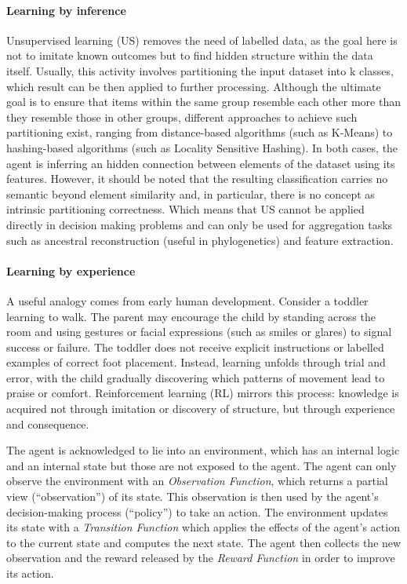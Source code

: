 \paragraph{Learning by inference}

Unsupervised learning (US) removes the need of labelled data, as the goal here is not to imitate known outcomes but to find hidden structure within the data itself.
Usually, this activity involves partitioning the input dataset into k classes, which result can be then applied to further processing.
Although the ultimate goal is to ensure that items within the same group resemble each other more than they resemble those in other groups, different approaches to achieve such partitioning exist, ranging from distance-based algorithms (such as K-Means) to hashing-based algorithms (such as Locality Sensitive Hashing).
In both cases, the agent is inferring an hidden connection between elements of the dataset using its features.
However, it should be noted that the resulting classification carries no semantic beyond element similarity and, in particular, there is no concept as intrinsic partitioning correctness. Which means that US cannot be applied directly in decision making problems and can only be used for aggregation tasks such as ancestral reconstruction (useful in phylogenetics) and feature extraction.

\paragraph{Learning by experience}

A useful analogy comes from early human development. Consider a toddler learning to walk. The parent may encourage the child by standing across the room and using gestures or facial expressions (such as smiles or glares) to signal success or failure. The toddler does not receive explicit instructions or labelled examples of correct foot placement. Instead, learning unfolds through trial and error, with the child gradually discovering which patterns of movement lead to praise or comfort. Reinforcement learning (RL) mirrors this process: knowledge is acquired not through imitation or discovery of structure, but through experience and consequence.

The agent is acknowledged to lie into an environment, which has an internal logic and an internal state but those are not exposed to the agent.
The agent can only observe the environment with an \textit{Observation Function}, which returns a partial view (``observation'') of its state.
This observation is then used by the agent's decision-making process (``policy'') to take an action.
The environment updates its state with a \textit{Transition Function} which applies the effects of the agent's action to the current state and computes the next state.
The agent then collects the new observation and the reward released by the \textit{Reward Function} in order to improve its action.

